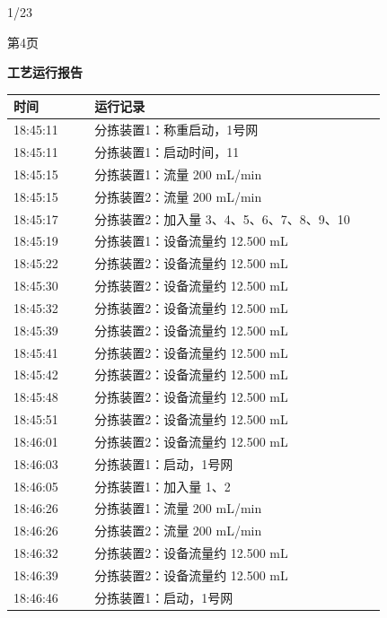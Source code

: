 \documentclass[UTF8,10pt,a4paper,fontset=fandol]{ctexart}
\newcommand{\handwritten}[1]{#1}
\begin{document}
\begin{center}
\begin{minipage}[t]{0.47\linewidth}
\handwritten{1/23}

\vfill
第4页
\end{minipage}
\end{center}


\newpage

\begin{center}
\begin{minipage}[t]{0.47\linewidth}
\centering
\textbf{工艺运行报告}

\scriptsize
\begin{tabular}{|p{0.20\linewidth}|p{0.72\linewidth}|}
\hline
时间 & 运行记录 \\ \hline
18:45:11 & 分拣装置1：称重启动，1号网 \\ \hline
18:45:11 & 分拣装置1：启动时间，11 \\ \hline
18:45:15 & 分拣装置1：流量 200 mL/min \\ \hline
18:45:15 & 分拣装置2：流量 200 mL/min \\ \hline
18:45:17 & 分拣装置2：加入量 3、4、5、6、7、8、9、10 \\ \hline
18:45:19 & 分拣装置1：设备流量约 12.500 mL \\ \hline
18:45:22 & 分拣装置2：设备流量约 12.500 mL \\ \hline
18:45:30 & 分拣装置2：设备流量约 12.500 mL \\ \hline
18:45:32 & 分拣装置2：设备流量约 12.500 mL \\ \hline
18:45:39 & 分拣装置2：设备流量约 12.500 mL \\ \hline
18:45:41 & 分拣装置2：设备流量约 12.500 mL \\ \hline
18:45:42 & 分拣装置2：设备流量约 12.500 mL \\ \hline
18:45:48 & 分拣装置2：设备流量约 12.500 mL \\ \hline
18:45:51 & 分拣装置2：设备流量约 12.500 mL \\ \hline
18:46:01 & 分拣装置2：设备流量约 12.500 mL \\ \hline
18:46:03 & 分拣装置1：启动，1号网 \\ \hline
18:46:05 & 分拣装置1：加入量 1、2 \\ \hline
18:46:26 & 分拣装置1：流量 200 mL/min \\ \hline
18:46:26 & 分拣装置2：流量 200 mL/min \\ \hline
18:46:32 & 分拣装置2：设备流量约 12.500 mL \\ \hline
18:46:39 & 分拣装置2：设备流量约 12.500 mL \\ \hline
18:46:46 & 分拣装置1：启动，1号网 \\ \hline
\end{tabular}


\end{minipage}
\end{center}
\end{document}
